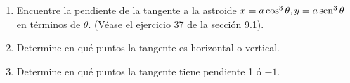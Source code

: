 \item 
    \begin{enumerate}
        \item[(a)] Encuentre la pendiente de la tangente a la astroide $x = a\cos^3\theta, y = a\operatorname{sen}^3\theta$ en términos de $\theta$. (Véase el ejercicio 37 de la sección 9.1).
        \item[(b)] Determine en qué puntos la tangente es horizontal o vertical.
        \item[(c)] Determine en qué puntos la tangente tiene pendiente 1 ó $-1$.
    \end{enumerate}
